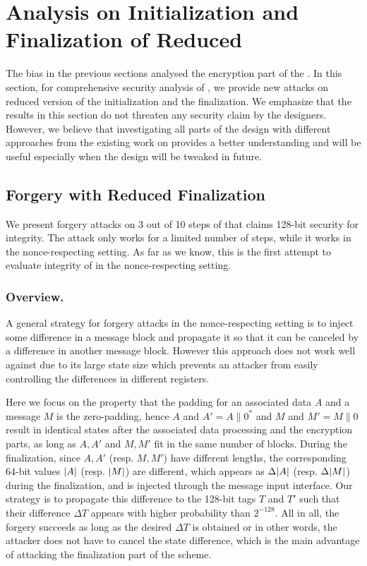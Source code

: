 
\section{Analysis on Initialization and Finalization of Reduced \texorpdfstring{\MORUS}{MORUS}}
\label{sec/IniFin}

The bias in the previous sections analysed the encryption part of the \MORUS. In this section, for comprehensive security analysis of \MORUS, we provide new attacks on reduced version of the initialization and the finalization. We emphasize that the results in this section do not threaten any security claim by the designers. However, we believe that investigating all parts of the design with different approaches from the existing work on \MORUS provides a better understanding and will be useful especially when the design will be tweaked in future.

\subsection{Forgery with Reduced Finalization}
\label{subsec/Fin}
We present forgery attacks on 3 out of 10 steps of \MORUS[1280] that claims 128-bit security for integrity. The attack only works for a limited number of steps, while it works in the nonce-respecting setting. As far as we know, this is the first attempt to evaluate integrity of \MORUS in the nonce-respecting setting.

\subsubsection{Overview.}
A general strategy for forgery attacks in the nonce-respecting setting is to inject some difference in a message block and propagate it so that it can be canceled by a difference in another message block. However this approach does not work well against \MORUS due to its large state size which prevents an attacker from easily controlling the differences in different registers. 

Here we focus on the property that the padding for an associated data $A$ and a message $M$ is the zero-padding, hence $A$ and $A'=A\|0^*$ and $M$ and $M'=M\|0$ result in identical states after the associated data processing and the encryption parts, as long as $A,A'$ and $M,M'$ fit in the same number of blocks. During the finalization, since $A,A'$ (resp. $M,M'$) have different lengths, the corresponding 64-bit values $|A|$ (resp. $|M|$) are different, which appears as $\Delta |A|$ (resp. $\Delta |M|$) during the finalization, and is injected through the message input interface. Our strategy is to propagate this difference to the 128-bit tags $T$ and $T'$ such that their difference $\Delta T$ appears with higher probability than $2^{-128}$. All in all, the forgery succeeds as long as the desired $\Delta T$ is obtained or in other words, the attacker does not have to cancel the state difference, which is the main advantage of attacking the finalization part of the scheme. 

